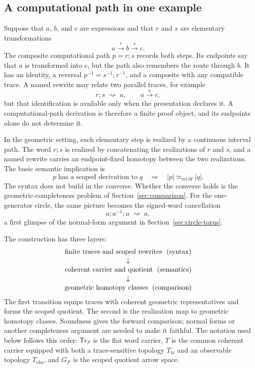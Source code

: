 \documentclass[10pt,reqno]{amsart}
\theoremstyle{definition}
\theoremstyle{plain}
\theoremstyle{remark}
\begin{document}
\subsection{A computational path in one example}

Suppose that $a$, $b$, and $c$ are expressions and that $r$ and $s$ are elementary
transformations
\[
  a\xrightarrow{r}b\xrightarrow{s}c.
\]
The composite computational path $p=r;s$ records both steps.  Its endpoints
say that $a$ is transformed into $c$, but the path also remembers the route
through $b$.  It has an identity, a reversal
$p^{-1}=s^{-1};r^{-1}$, and a composite with any compatible trace.  A named
rewrite may relate two parallel traces, for example
\[
  r;s\;\rightsquigarrow\;u,
  \qquad a\xrightarrow{u}c,
\]
but that identification is available only when the presentation declares it.
A computational-path derivation is therefore a finite proof object, and its
endpoints alone do not determine it.

In the geometric setting, each elementary step is realized by a continuous
interval path.  The word $r;s$ is realized by concatenating the realizations
of $r$ and $s$, and a named rewrite carries an endpoint-fixed homotopy between
the two realizations.  The basic semantic implication is
\[
  p\;\text{has a scoped derivation to}\;q
  \quad\Longrightarrow\quad
  |p|\simeq_{\mathrm{rel}\,\partial I}|q|.
\]
The syntax does not build in the converse.  Whether the converse holds is
the geometric-completeness problem of Section~\ref{sec:comparison}.  For the one-generator
circle, the same picture becomes the signed-word cancellation
\[
  a;a^{-1};a\;\rightsquigarrow\;a,
\]
a first glimpse of the normal-form argument in Section~\ref{sec:circle-torus}.

The construction has three layers:
\[
  \begin{gathered}
    \text{finite traces and scoped rewrites \;(syntax)}\\[-2pt]
    \mathord{\downarrow}\\[-2pt]
    \text{coherent carrier and quotient \;(semantics)}\\[-2pt]
    \mathord{\downarrow}\\[-2pt]
    \text{geometric homotopy classes \;(comparison)}
  \end{gathered}
\]
The first transition equips traces with coherent geometric representatives
and forms the scoped quotient.  The second is the realization map to geometric
homotopy classes.  Soundness gives the forward comparison;
normal forms or another completeness argument are needed to make it faithful.
The notation used below follows this order: $\mathsf{Tr}_{\mathcal P}$ is the
flat word carrier, $T$ is the common coherent carrier equipped with both a
trace-sensitive topology $T_{\mathrm{tr}}$ and an observable topology
$T_{\mathrm{obs}}$, and $G_{\mathcal P}$ is the scoped quotient arrow space.
\end{document}

